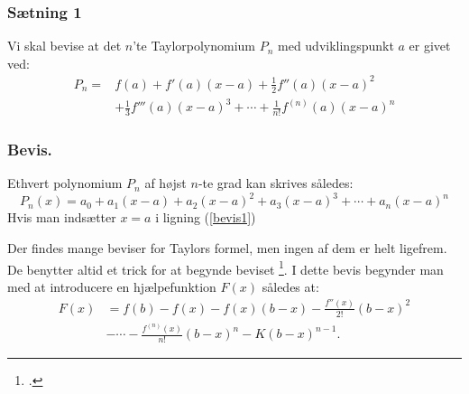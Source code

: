 \documentclass[12pt, a4paper]{article}
\begin{document}
\begin{refsection}
\subsubsection{Sætning 1}
Vi skal bevise at det $n $'te Taylorpolynomium $P_n$ med udviklingspunkt $a$ er givet ved:
\begin{equation*}
    \begin{aligned}
        P_n= &f(a)+f'(a)(x-a)+\frac{1}{2}f''(a)(x-a)^2\\
             &+\frac{1}{3}f'''(a)(x-a)^3+\cdots+\frac{1}{n!}f^{(n)}(a)(x-a)^n
    \end{aligned}
\end{equation*}
\subsubsection{Bevis.}
Ethvert polynomium $P_n$ af højst $n$-te grad kan skrives således:
 \begin{equation}\label{bevis1}
    P_n(x)=a_0+a_1(x-a)+a_2(x-a)^2+a_3(x-a)^3+\cdots+a_n(x-a)^n
\end{equation}
Hvis man indsætter $x=a$ i ligning (\ref{bevis1})

Der findes mange beviser for Taylors formel, men ingen af dem er helt ligefrem. De benytter altid et trick for at begynde beviset \footcite[A-44]{calculuswithanalyticgeometry}. I dette bevis begynder man med at introducere en hjælpefunktion $F(x)$ således at:
\begin{equation}\label{bevisrest1}
 \begin{aligned}
     F(x)&=f(b)-f(x)-f(x)(b-x)-\frac{f''(x)}{2!}(b-x)^2\\
         &- \cdots -\frac{f^{(n)}(x)}{n!}(b-x)^n-K(b-x)^{n-1}.
\end{aligned}
\end{equation}


\end{refsection}
\end{document}
